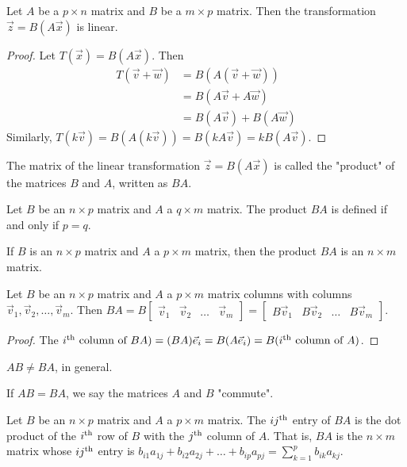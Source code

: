 \documentclass[a4paper,11pt]{article}
\begin{document}
\begin{outline}
    Let \(A\) be a \(p \times n\) matrix and \(B\) be a \(m \times p\) matrix. Then the transformation
    \(\vec{z} = B(A\vec{x})\) is linear.
    
    \begin{proof}
      Let \(T(\vec{x}) = B(A\vec{x})\). Then
      \begin{align*}
        T(\vec{v}+\vec{w}) &= B(A(\vec{v}+\vec{w}))     \\
                           &= B(A\vec{v}+A\vec{w})      \\
                           &= B(A\vec{v}) + B(A\vec{w})
      \end{align*}
      Similarly, \(T(k\vec{v}) = B(A(k\vec{v})) = B(kA\vec{v}) = kB(A\vec{v})\).
    \end{proof}
    
    The matrix of the linear transformation \(\vec{z} = B(A\vec{x})\) is called the "product" of the matrices \(B\)
    and \(A\), written as \(BA\).
    
    Let \(B\) be an \(n \times p\) matrix and \(A\) a \(q \times m\) matrix. The product \(BA\) is defined
    if and only if \(p = q\).
    
    If \(B\) is an \(n \times p\) matrix and \(A\) a \(p \times m\) matrix, then the product \(BA\) is
    an \(n \times m\) matrix.
    
    Let \(B\) be an \(n \times p\) matrix and \(A\) a \(p \times m\) matrix columns with columns
    \(\vec{v}_1, \vec{v}_2, \ldots, \vec{v}_m\). Then \(BA = B\begin{bmatrix} \vec{v}_1 & \vec{v}_2 & \ldots
    & \vec{v}_m\end{bmatrix} = \begin{bmatrix} B\vec{v}_1 & B\vec{v}_2 & \ldots & B\vec{v}_m\end{bmatrix}\).
    
    \begin{proof}
      The \(i\textsuperscript{th} \text{ column of } BA) = (BA)\vec{e}_i = B(A\vec{e}_i) = B(i\textsuperscript{th}
      \text{ column of } A)\).
    \end{proof}
    
    \(AB \neq BA\), in general.
    
    If \(AB = BA\), we say the matrices \(A\) and \(B\) "commute".
    
    Let \(B\) be an \(n \times p\) matrix and \(A\) a \(p \times m\) matrix. The \(ij\textsuperscript{th}\) entry
    of \(BA\) is the dot product of the \(i\textsuperscript{th}\) row of \(B\) with the \(j\textsuperscript{th}\) column
    of \(A\). That is, \(BA\) is the \(n \times m\) matrix whose \(ij\textsuperscript{th}\) entry is \(b_{i1}a_{1j} +
    b_{i2}a_{2j} + \ldots + b_{ip}a_{pj} = \sum_{k=1}^p b_{ik}a_{kj}\).
    

\end{outline}
\end{document}
